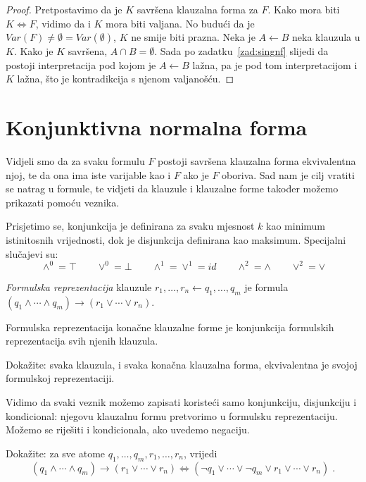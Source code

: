 \begin{proof}
Pretpostavimo da je $K$ savršena klauzalna forma za $F$. Kako mora biti $K\Leftrightarrow F$, vidimo da i $K$ mora biti valjana. No budući da je $Var(F)\not=\emptyset=Var(\emptyset)$, $K$ ne smije biti prazna. Neka je $A\leftarrow B$ neka klauzula u $K$. Kako je $K$ savršena, $A\cap B=\emptyset$. Sada po zadatku~\ref{zad:singnf} slijedi da postoji interpretacija pod kojom je $A\leftarrow B$ lažna, pa je pod tom interpretacijom i $K$ lažna, što je kontradikcija s njenom valjanošću.
\end{proof}

\section{Konjunktivna normalna forma}

Vidjeli smo da za svaku formulu $F$ postoji savršena klauzalna forma ekvivalentna njoj, te da ona ima iste varijable kao i $F$ ako je $F$ oboriva. Sad nam je cilj vratiti se natrag u formule, te vidjeti da klauzule i klauzalne forme također možemo prikazati pomoću veznika.

Prisjetimo se, konjunkcija je definirana za svaku mjesnost $k$ kao minimum istinitosnih vrijednosti, dok je disjunkcija definirana kao maksimum. Specijalni slučajevi su:
$$\wedge^0=\top\qquad\vee^0=\bot\qquad\wedge^1=\vee^1=id\qquad\wedge^2=\wedge\qquad\vee^2=\vee$$

\begin{definicija}
\emph{Formulska reprezentacija} klauzule $r_1,\ldots,r_n\leftarrow q_1,\ldots,q_m$ je formula $(q_1\wedge\cdots\wedge q_m)\to(r_1\vee\cdots\vee r_n)$.

Formulska reprezentacija konačne klauzalne forme je konjunkcija formulskih reprezentacija svih njenih klauzula.
\end{definicija}

\begin{zadatak}\label{zad:clfeqfr}
Dokažite: svaka klauzula, i svaka konačna klauzalna forma, ekvivalentna je svojoj formulskoj reprezentaciji.
\end{zadatak}

Vidimo da svaki veznik možemo zapisati koristeći samo konjunkciju, disjunkciju i kondicional: njegovu klauzalnu formu pretvorimo u formulsku reprezentaciju. Možemo se riješiti i kondicionala, ako uvedemo negaciju.

\begin{zadatak}\label{zad:clfcnf}
	Dokažite: za sve atome $q_1,\ldots,q_m,r_1,\ldots,r_n$, vrijedi
	$$(q_1\wedge\cdots\wedge q_m)\to(r_1\vee\cdots\vee r_n)
	\Longleftrightarrow
	(\neg q_1\vee\cdots\vee\neg q_m\vee r_1\vee\cdots\vee r_n)\;.
	$$
\end{zadatak}

